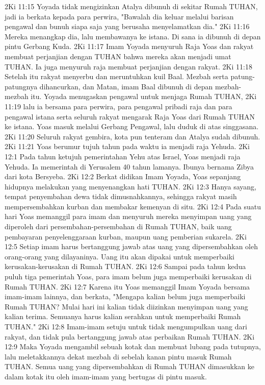2Ki 11:15  Yoyada tidak mengizinkan Atalya dibunuh di sekitar Rumah TUHAN, jadi ia berkata kepada para perwira, "Bawalah dia keluar melalui barisan pengawal dan bunuh siapa saja yang berusaha menyelamatkan dia."
2Ki 11:16  Mereka menangkap dia, lalu membawanya ke istana. Di sana ia dibunuh di depan pintu Gerbang Kuda.
2Ki 11:17  Imam Yoyada menyuruh Raja Yoas dan rakyat membuat perjanjian dengan TUHAN bahwa mereka akan menjadi umat TUHAN. Ia juga menyuruh raja membuat perjanjian dengan rakyat.
2Ki 11:18  Setelah itu rakyat menyerbu dan meruntuhkan kuil Baal. Mezbah serta patung-patungnya dihancurkan, dan Matan, imam Baal dibunuh di depan mezbah-mezbah itu. Yoyada menugaskan pengawal untuk menjaga Rumah TUHAN,
2Ki 11:19  lalu ia bersama para perwira, para pengawal pribadi raja dan para pengawal istana serta seluruh rakyat mengarak Raja Yoas dari Rumah TUHAN ke istana. Yoas masuk melalui Gerbang Pengawal, lalu duduk di atas singgasana.
2Ki 11:20  Seluruh rakyat gembira, kota pun tenteram dan Atalya sudah dibunuh.
2Ki 11:21  Yoas berumur tujuh tahun pada waktu ia menjadi raja Yehuda.
2Ki 12:1  Pada tahun ketujuh pemerintahan Yehu atas Israel, Yoas menjadi raja Yehuda. Ia memerintah di Yerusalem 40 tahun lamanya. Ibunya bernama Zibya dari kota Bersyeba.
2Ki 12:2  Berkat didikan Imam Yoyada, Yoas sepanjang hidupnya melakukan yang menyenangkan hati TUHAN.
2Ki 12:3  Hanya sayang, tempat penyembahan dewa tidak dimusnahkannya, sehingga rakyat masih mempersembahkan kurban dan membakar kemenyan di situ.
2Ki 12:4  Pada suatu hari Yoas memanggil para imam dan menyuruh mereka menyimpan uang yang diperoleh dari persembahan-persembahan di Rumah TUHAN, baik uang pembayaran penyelenggaraan kurban, maupun uang pemberian sukarela.
2Ki 12:5  Setiap imam harus bertanggung jawab atas uang yang dipersembahkan oleh orang-orang yang dilayaninya. Uang itu akan dipakai untuk memperbaiki kerusakan-kerusakan di Rumah TUHAN.
2Ki 12:6  Sampai pada tahun kedua puluh tiga pemerintah Yoas, para imam belum juga memperbaiki kerusakan di Rumah TUHAN.
2Ki 12:7  Karena itu Yoas memanggil Imam Yoyada bersama imam-imam lainnya, dan berkata, "Mengapa kalian belum juga memperbaiki Rumah TUHAN? Mulai hari ini kalian tidak diizinkan menyimpan uang yang kalian terima. Semuanya harus kalian serahkan untuk memperbaiki Rumah TUHAN."
2Ki 12:8  Imam-imam setuju untuk tidak mengumpulkan uang dari rakyat, dan tidak pula bertanggung jawab atas perbaikan Rumah TUHAN.
2Ki 12:9  Maka Yoyada mengambil sebuah kotak dan membuat lubang pada tutupnya, lalu meletakkannya dekat mezbah di sebelah kanan pintu masuk Rumah TUHAN. Semua uang yang dipersembahkan di Rumah TUHAN dimasukkan ke dalam kotak itu oleh imam-imam yang bertugas di pintu masuk.
